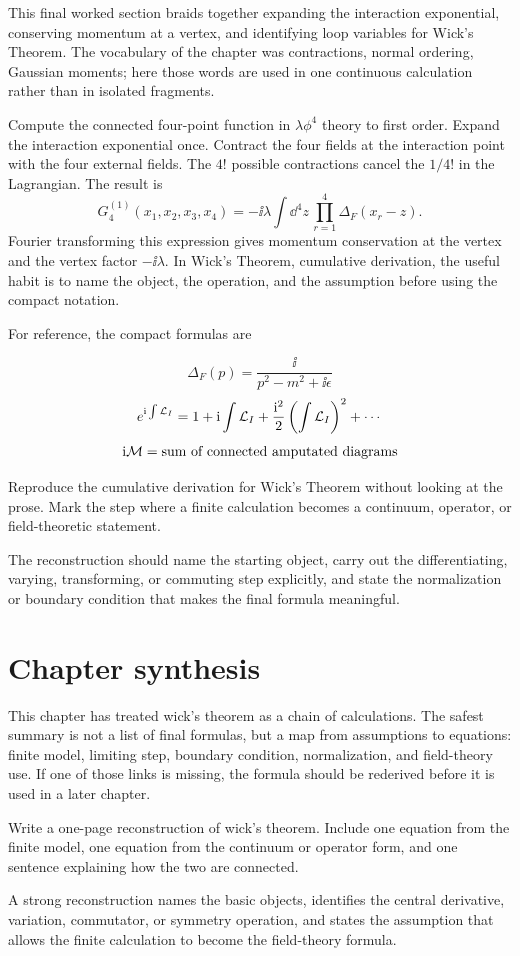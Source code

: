 This final worked section braids together expanding the interaction exponential, conserving momentum at a vertex, and identifying loop variables for Wick's Theorem.  The vocabulary of the chapter was contractions, normal ordering, Gaussian moments; here those words are used in one continuous calculation rather than in isolated fragments.

Compute the connected four-point function in \(\lambda\phi^4\) theory to first order.  Expand the interaction exponential once.  Contract the four fields at the interaction point with the four external fields.  The \(4!\) possible contractions cancel the \(1/4!\) in the Lagrangian.  The result is
\[
  G_4^{(1)}(x_1,x_2,x_3,x_4)=
  -\ii\lambda\int\dd^4z\,\prod_{r=1}^4\Delta_F(x_r-z).
\]
Fourier transforming this expression gives momentum conservation at the vertex and the vertex factor \(-\ii\lambda\).  In Wick's Theorem, cumulative derivation, the useful habit is to name the object, the operation, and the assumption before using the compact notation.

For reference, the compact formulas are

\[
  \Delta_F(p)=\frac{\ii}{p^2-m^2+\ii\epsilon}
\]
\[
  e^{\mathrm i\int\mathcal L_I}=1+\mathrm i\int\mathcal L_I+\frac{\mathrm i^2}{2}\left(\int\mathcal L_I\right)^2+\cdots
\]
\[
  \mathrm i\mathcal M=\hbox{sum of connected amputated diagrams}
\]

\begin{exercise}
Reproduce the cumulative derivation for Wick's Theorem without looking at the prose.  Mark the step where a finite calculation becomes a continuum, operator, or field-theoretic statement.
\begin{answer}
The reconstruction should name the starting object, carry out the differentiating, varying, transforming, or commuting step explicitly, and state the normalization or boundary condition that makes the final formula meaningful.
\end{answer}
\end{exercise}



\section{Chapter synthesis}

This chapter has treated wick's theorem as a chain of calculations.  The safest summary is not a list of final formulas, but a map from assumptions to equations: finite model, limiting step, boundary condition, normalization, and field-theory use.  If one of those links is missing, the formula should be rederived before it is used in a later chapter.

\begin{exercise}
Write a one-page reconstruction of wick's theorem.  Include one equation from the finite model, one equation from the continuum or operator form, and one sentence explaining how the two are connected.
\begin{answer}
A strong reconstruction names the basic objects, identifies the central derivative, variation, commutator, or symmetry operation, and states the assumption that allows the finite calculation to become the field-theory formula.
\end{answer}
\end{exercise}
